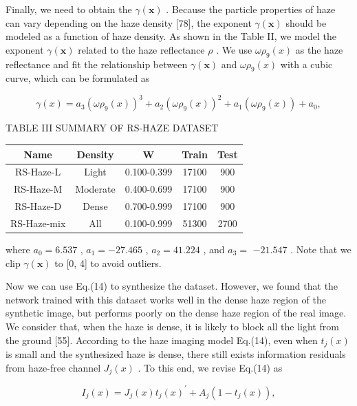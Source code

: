 Finally, we need to obtain the $\gamma(\boldsymbol{x})$ . Because the particle properties of haze can vary depending on the haze density [78], the exponent $\gamma(\boldsymbol{x})$ should be modeled as a function of haze density. As shown in the Table II, we model the exponent $\gamma(\boldsymbol{x})$ related to the haze reflectance $\rho$ . We use $\omega\rho_{9}(x)$ as the haze reflectance and fit the relationship between $\gamma(\boldsymbol{x})$ and $\omega\rho_{9}(x)$ with a cubic curve, which can be formulated as

\begin{equation}
\gamma(x)=a_{3}(\omega\rho_{9}(x))^{3}+a_{2}(\omega\rho_{9}(x))^{2}+a_{1}(\omega\rho_{9}(x))+a_{0},
\end{equation}

TABLE III SUMMARY OF RS-HAZE DATASET


\begin{table}[htbp]
\centering
\begin{tabular}{|c|c|c|c|c|}\hline
Name & Density & W & Train & Test \\ \hline
RS-Haze-L & Light & 0.100-0.399 & 17100 & 900 \\ \hline
RS-Haze-M & Moderate & 0.400-0.699 & 17100 & 900 \\ \hline
RS-Haze-D & Dense & 0.700-0.999 & 17100 & 900 \\ \hline
RS-Haze-mix & All & 0.100-0.999 & 51300 & 2700 \\ \hline
\end{tabular}\end{table}

where $a_{0}=6.537$ , $a_{1}=-27.465$ , $a_{2}=41.224$ , and $a_{3}=$ $-21.547$ . Note that we clip $\gamma(\boldsymbol{x})$ to [0, 4] to avoid outliers.

Now we can use Eq.(14) to synthesize the dataset. However, we found that the network trained with this dataset works well in the dense haze region of the synthetic image, but performs poorly on the dense haze region of the real image. We consider that, when the haze is dense, it is likely to block all the light from the ground [55]. According to the haze imaging model Eq.(14), even when $t_{j}(x)$ is small and the synthesized haze is dense, there still exists information residuals from haze-free channel $J_{j}(x)$ . To this end, we revise Eq.(14) as

\begin{equation}
I_{j}(x)=J_{j}(x)t_{j}(x)^{\prime}+A_{j}\left(1-t_{j}(x)\right),
\end{equation}

